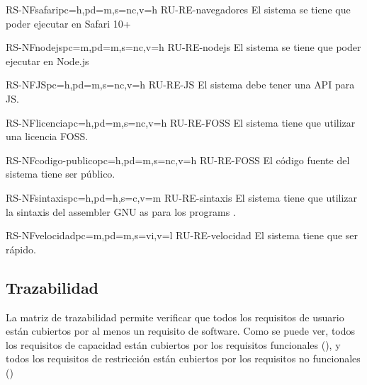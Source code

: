\begin{softwareReq}{RS-NF}{safari}{pc=h,pd=m,s=nc,v=h}
    {RU-RE-navegadores}
    El sistema se tiene que poder ejecutar en Safari 10+
\end{softwareReq}

\begin{softwareReq}{RS-NF}{nodejs}{pc=m,pd=m,s=nc,v=h}
    {RU-RE-nodejs}
    El sistema se tiene que poder ejecutar en Node.js
\end{softwareReq}

\begin{softwareReq}{RS-NF}{JS}{pc=h,pd=m,s=nc,v=h}
    {RU-RE-JS}
    El sistema debe tener una \gls{API} para \gls{JS}.
\end{softwareReq}

\begin{softwareReq}{RS-NF}{licencia}{pc=h,pd=m,s=nc,v=h}
    {RU-RE-FOSS}
    El sistema tiene que utilizar una licencia \gls{FOSS}.
\end{softwareReq}

\begin{softwareReq}{RS-NF}{codigo-publico}{pc=h,pd=m,s=nc,v=h}
    {RU-RE-FOSS}
    El código fuente del sistema tiene ser público.
\end{softwareReq}

\begin{softwareReq}{RS-NF}{sintaxis}{pc=h,pd=h,s=c,v=m}
    {RU-RE-sintaxis}
    El sistema tiene que utilizar la sintaxis del \gls{assembler} GNU as para
    los \glspl{program} .
\end{softwareReq}

\begin{softwareReq}{RS-NF}{velocidad}{pc=m,pd=m,s=vi,v=l}
    {RU-RE-velocidad}
    El sistema tiene que ser rápido. %
\end{softwareReq}

\FloatBarrier


\subsection{Trazabilidad}\label{subsec:trazability}

La matriz de trazabilidad permite verificar que todos los requisitos de usuario
están cubiertos por al menos un requisito de software. Como se puede ver, todos
los requisitos de capacidad están cubiertos por los requisitos funcionales
(), y todos los requisitos de restricción están
cubiertos por los requisitos no funcionales ()

